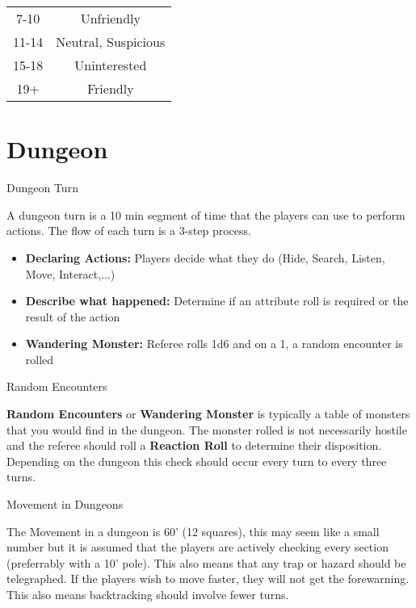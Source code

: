 \begin{multicols}{2}
\begin{table}[H]
\begin{center}
\begin{tabular}{ c  c  }
7-10 &  Unfriendly\\

11-14 & Neutral, Suspicious \\

15-18 & Uninterested \\

19+ & Friendly \\


\end{tabular}
\end{center}
\label{table:RollingAttributes}
\vspace{-1cm}
\end{table}


\section*{Dungeon}
\begin{mercHeading}
Dungeon Turn
\end{mercHeading}
A dungeon turn is a 10 min segment of time that the players can use to perform actions. The flow of each turn is a 3-step process.
\begin{itemize}
\setlength\itemsep{0em}
	\item \textbf{Declaring Actions:} Players decide what they do (Hide, Search, Listen, Move, Interact,...)
	\item \textbf{Describe what happened:} Determine if an attribute roll is required or the result of the action
	\item \textbf{Wandering Monster:} Referee rolls 1d6 and on a 1, a random encounter is rolled
\end{itemize}
\begin{mercHeading}
Random Encounters
\end{mercHeading}
\textbf{Random Encounters} or \textbf{Wandering Monster} is typically a table of monsters that you would find in the dungeon. The monster rolled is not necessarily hostile and the referee should roll a \textbf{Reaction Roll} to determine their disposition. Depending on the dungeon this check should occur every turn to every three turns.

\begin{mercHeading}
Movement in Dungeons
\end{mercHeading}
The Movement in a dungeon is 60' (12 squares), this may seem like a small number but it is assumed that the players are actively checking every section (preferrably with a 10' pole). This also means that any trap or hazard should be telegraphed. If the players wish to move faster, they will not get the forewarning. This also means backtracking should involve fewer turns. 



\end{multicols}
